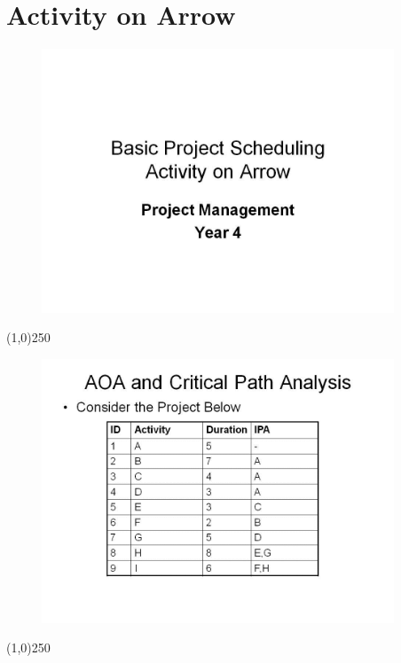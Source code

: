 \section{Activity on Arrow}



\begin{frame}
\begin{figure}
	\centering
		\includegraphics[width = 10.5cm]{oldnotes/Slide60.jpg}
\end{figure}
\end{frame}
\begin{center}\line(1,0){250}\end{center}


\begin{frame}
\begin{figure}
	\centering
		\includegraphics[width = 10.5cm]{oldnotes/Slide61.jpg}
\end{figure}
\end{frame}
\begin{center}\line(1,0){250}\end{center}



